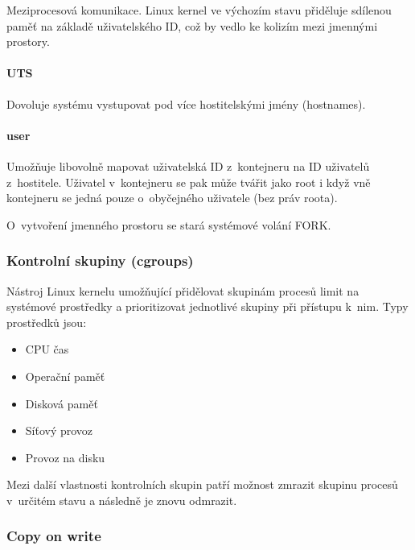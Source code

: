 Meziprocesová komunikace.
Linux kernel ve výchozím stavu přiděluje sdílenou paměť na základě uživatelského ID, což by vedlo ke kolizím mezi jmennými prostory.


\paragraph{UTS}

Dovoluje systému vystupovat pod více hostitelskými jmény (hostnames).

\paragraph{user}

Umožňuje libovolně mapovat uživatelská ID z~kontejneru na ID uživatelů z~hostitele.
Uživatel v~kontejneru se pak může tvářit jako root i když vně kontejneru se jedná pouze o~obyčejného uživatele (bez práv roota).


O~vytvoření jmenného prostoru se stará systémové volání FORK.

\subsubsection{Kontrolní skupiny (cgroups)}

Nástroj Linux kernelu umožňující přidělovat skupinám procesů limit na systémové prostředky a prioritizovat jednotlivé skupiny při přístupu k~nim.
Typy prostředků jsou:
\begin{itemize}
	\item CPU čas
	\item Operační paměť
	\item Disková paměť %
	\item Síťový provoz
	\item Provoz na disku
\end{itemize}

Mezi další vlastnosti kontrolních skupin patří možnost zmrazit skupinu procesů v~určitém stavu a následně je znovu odmrazit. %


\subsubsection{Copy on write}

